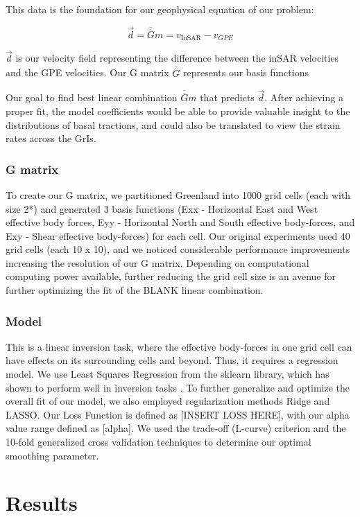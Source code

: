 \documentclass{article}
\begin{document}
This data is the foundation for our geophysical equation of our problem:

$$
\vec{d}=\overline{\overline{G}} m=v_{\text {InSAR}}-v_{GPE}
$$

$\vec{d}$ is our velocity field representing the difference between the inSAR velocities and the GPE velocities. Our G matrix $\overline{\overline{G}}$ represents our basis functions 

Our goal to find best linear combination $\overline{\overline{G}} m$ that predicts $\vec{d}$. After achieving a proper fit, the model coefficients would be able to provide valuable insight to the distributions of basal tractions, and could also be translated to view the strain rates across the GrIs.

\subsubsection{G matrix}
To create our G matrix, we partitioned Greenland into 1000 grid cells (each with size 2*) and generated 3 basis functions (Exx - Horizontal East and West effective body forces, Eyy - Horizontal North and South effective body-forces, and Exy - Shear effective body-forces) for each cell. Our original experiments used 40 grid cells (each 10 x 10), and we noticed considerable performance improvements increasing the resolution of our G matrix. Depending on computational computing power available, further reducing the grid cell size is an avenue for further optimizing the fit of the BLANK linear combination.   

\subsubsection{Model}

This is a linear inversion task, where the effective body-forces in one grid cell can have effects on its surrounding cells and beyond. Thus, it requires a regression model. We use Least Squares Regression from the sklearn library, which has shown to perform well in inversion tasks \cite{lines_review_1984}. To further generalize and optimize the overall fit of our model, we also employed regularization methods Ridge and LASSO. Our Loss Function is defined as [INSERT LOSS HERE], with our alpha value range defined as [alpha]. We used the trade-off (L-curve) criterion and the 10-fold generalized cross validation techniques to determine our optimal smoothing parameter. 

\section{Results}
\end{document}
